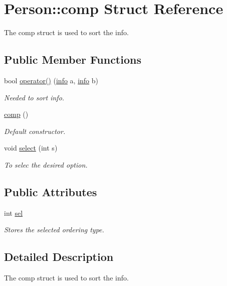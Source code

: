 \hypertarget{struct_person_1_1comp}{\section{Person\+:\+:comp Struct Reference}
\label{struct_person_1_1comp}
}


The comp struct is used to sort the info.  


\subsection*{Public Member Functions}
\begin{DoxyCompactItemize}
\item 
bool \hyperlink{struct_person_1_1comp_a99053054fa60fef569df526d680b9993}{operator()} (\hyperlink{structinfo}{info} a, \hyperlink{structinfo}{info} b)
\begin{DoxyCompactList}\small\item\em Needed to sort info. \end{DoxyCompactList}\item 
\hyperlink{struct_person_1_1comp_a5272710b2721399c612bcdad1b1cead7}{comp} ()
\begin{DoxyCompactList}\small\item\em Default constructor. \end{DoxyCompactList}\item 
void \hyperlink{struct_person_1_1comp_af552a34297c810b79725508e2d5d810a}{select} (int s)
\begin{DoxyCompactList}\small\item\em To selec the desired option. \end{DoxyCompactList}\end{DoxyCompactItemize}
\subsection*{Public Attributes}
\begin{DoxyCompactItemize}
\item 
int \hyperlink{struct_person_1_1comp_a85555416f9f001302f50825aa149ced3}{sel}
\begin{DoxyCompactList}\small\item\em Stores the selected ordering type. \end{DoxyCompactList}\end{DoxyCompactItemize}


\subsection{Detailed Description}
The comp struct is used to sort the info. 

